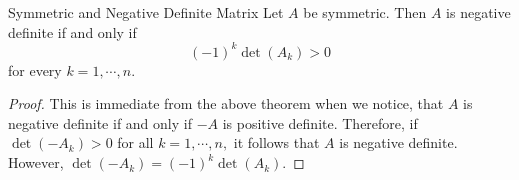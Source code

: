 \begin{corollary}{Symmetric and Negative Definite Matrix}\label{cor:symmetricdefinitematrix} \label{pd3} 
Let $A$ be symmetric. Then $A$ is negative definite if and only
if 
\begin{equation*}
\left( -1\right) ^{k} \det \left( A_{k}\right) >0
\end{equation*}
for every $k=1,\cdots ,n$.
\end{corollary}

\begin{proof}This is immediate from the above theorem when we notice,
that $A$ is negative definite if and only if $-A$ is positive definite.
Therefore, if $\det \left( -A_{k}\right) >0$ for all $k=1,\cdots ,n,$ it
follows that $A$ is negative definite. However, $\det \left( -A_{k}\right)
=\left( -1\right) ^{k}\det \left( A_{k}\right) .$ 
\end{proof}